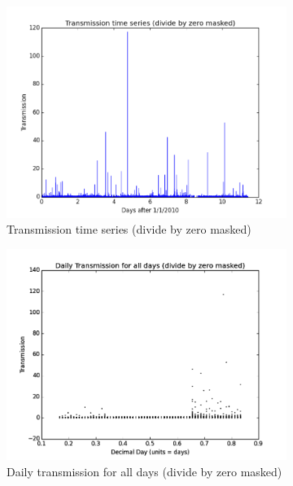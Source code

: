 \documentclass[a4paper,titlepage, twoside]{report}
\begin{document}
\begin{figure}
\centering
\begin{subfigure}{0.48\textwidth}
\includegraphics[width=\textwidth]{000a_transmission_errors_1.png}
\caption{Transmission time series (divide by zero masked)}
\end{subfigure}
\hfill
\begin{subfigure}{0.48\textwidth}
\includegraphics[width=\textwidth]{000b_transmission_errors_2.png}
\caption{Daily transmission for all days (divide by zero masked)}
\end{subfigure}
\\
\begin{subfigure}{0.48\textwidth}

\end{subfigure}
\end{figure}
\end{document}
